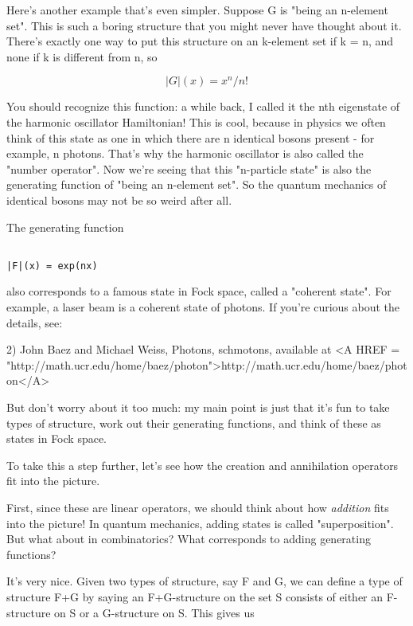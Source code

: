 Here's another example that's even simpler.  Suppose G is "being an
n-element set".  This is such a boring structure that you might never
have thought about it.  There's exactly one way to put this structure on
an k-element set if k = n, and none if k is different from n, so


$$

|G|(x) =  x^{n} / n!
$$
    
You should recognize this function: a while back, I called it the nth
eigenstate of the harmonic oscillator Hamiltonian!  This is cool,
because in physics we often think of this state as one in which there
are n identical bosons present - for example, n photons.  That's why
the harmonic oscillator is also called the "number operator".   Now
we're seeing that this "n-particle state" is also the generating
function of "being an n-element set".  So the quantum mechanics of
identical bosons may not be so weird after all.

The generating function


\begin{verbatim}

|F|(x) = exp(nx)
\end{verbatim}
    
also corresponds to a famous state in Fock space, called a
"coherent state".  For example, a laser beam is a coherent
state of photons.  If you're curious about the details, see:

2) John Baez and Michael Weiss, Photons, schmotons, available at
<A HREF = "http://math.ucr.edu/home/baez/photon">http://math.ucr.edu/home/baez/photon</A>

But don't worry about it too much: my main point is just that it's fun
to take types of structure, work out their generating functions, and
think of these as states in Fock space.  

To take this a step further, let's see how the creation and annihilation
operators fit into the picture.

First, since these are linear operators, we should think about how
\emph{addition} fits into the picture!  In quantum mechanics, adding states
is called "superposition".  But what about in combinatorics?  What
corresponds to adding generating functions?

It's very nice.  Given two types of structure, say F and G, we can
define a type of structure F+G by saying an F+G-structure on the set S
consists of either an F-structure on S or a G-structure on S.  This
gives us


